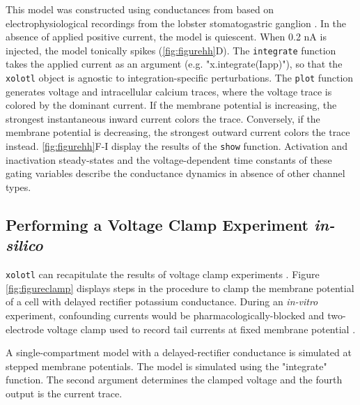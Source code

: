 \documentclass{frontiersSCNS} %
\begin{document}
This model was constructed using conductances from \cite{liuModelNeuronActivitydependent1998} based on electrophysiological recordings from the lobster stomatogastric ganglion \autocite{turrigianoSelectiveRegulationCurrent1995}. In the absence of applied positive current, the model is quiescent. When 0.2 nA is injected, the model tonically spikes (\ref{fig:figurehh}D). The \texttt{integrate} function takes the applied current as an argument (e.g. "x.integrate(Iapp)"), so that the \texttt{xolotl} object is agnostic to integration-specific perturbations. The \texttt{plot} function generates voltage and intracellular calcium traces, where the voltage trace is colored by the dominant current. If the membrane potential is increasing, the strongest instantaneous inward current colors the trace. Conversely, if the membrane potential is decreasing, the strongest outward current colors the trace instead. \ref{fig:figurehh}F-I display the results of the \texttt{show} function. Activation and inactivation steady-states and the voltage-dependent time constants of these gating variables describe the conductance dynamics in absence of other channel types.

%
%
%
%
%
%

\subsection{Performing a Voltage Clamp Experiment \textit{in-silico}}

\texttt{xolotl} can recapitulate the results of voltage clamp experiments \autocite{turrigianoSelectiveRegulationCurrent1995, swensenMultiplePeptidesConverge2000, swensenModulatorsConvergentCellular2001, destexheDynamicClampPrinciplesApplications2009}. Figure \ref{fig:figureclamp} displays steps in the procedure to clamp the membrane potential of a cell with delayed rectifier potassium conductance. During an \textit{in-vitro} experiment, confounding currents would be pharmacologically-blocked and two-electrode voltage clamp used to record tail currents at fixed membrane potential \autocite{connorInwardDelayedOutward1971, connorVoltageClampStudies1971}.

A single-compartment model with a delayed-rectifier conductance is simulated at stepped membrane potentials. The model is simulated using the "integrate" function. The second argument determines the clamped voltage and the fourth output is the current trace.
\end{document}

